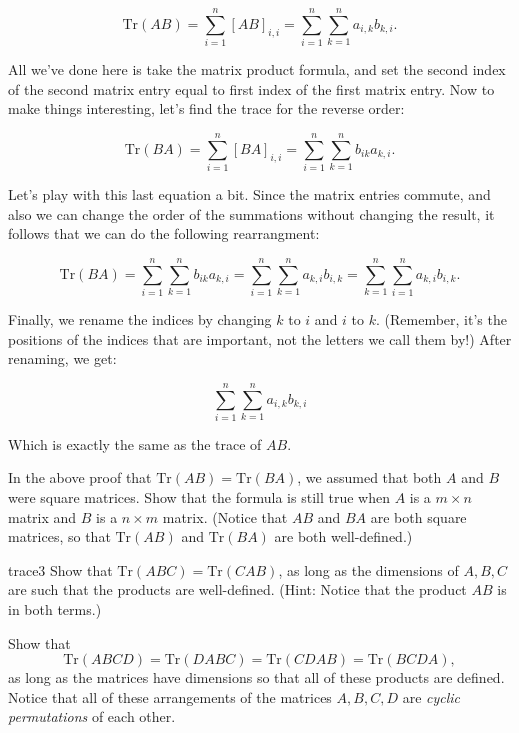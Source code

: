 \[ \text{Tr} \left({A} {B}\right) = \sum_{i=1}^n [AB]_{i,i} = \sum_{i=1}^n \sum_{k=1}^n a_{i,k}b_{k,i}. \]

All we've done here is take the matrix product formula, and set the second index of the second  matrix entry equal to first index of the first matrix entry.  Now to make things interesting, let's find the trace for the reverse order:

\[ \text{Tr} \left({B} {A}\right) = \sum_{i=1}^n [BA]_{i,i} = \sum_{i=1}^n \sum_{k=1}^n b_{ik}a_{k,i}. \]

Let's play with this last equation a bit. Since the matrix entries commute, and also  we can change the order of the summations without changing the result, it follows that we can do the following rearrangment:

\[ \text{Tr} \left({B} {A}\right) =\sum_{i=1}^n \sum_{k=1}^n b_{ik}a_{k,i} = \sum_{i=1}^n \sum_{k=1}^n a_{k,i}b_{i,k} = \sum_{k=1}^n \sum_{i=1}^n a_{k,i}b_{i,k}. \]

Finally, we rename the indices by changing $k$ to $i$ and $i$ to $k$.  (Remember, it's the positions of the indices that are important, not the letters we call them by!)  After renaming, we get:

\[ \sum_{i=1}^n \sum_{k=1}^n a_{i,k}b_{k,i} \]

Which is exactly the same as the trace of ${A}{B}$.

\begin {exercise}{}
In the above proof that $\text{Tr} ({AB}) = \text{Tr}({BA})$, we assumed that both $A$ and $B$ were square matrices. Show that the formula is still true when $A$ is a $m \times n$ matrix and $B$ is a $n \times m$ matrix.  (Notice that $AB$ and $BA$ are both square matrices, so that $\text{Tr} \left({A} {B}\right)$ and $\text{Tr} \left({B} {A}\right)$ are both well-defined.)
\end{exercise}

\begin {exercise}{trace3}
Show that $\text{Tr} ({ABC}) = \text{Tr}({CAB})$, as long as the dimensions of $A, B, C$ are such that the products are well-defined.
(Hint: Notice that the product ${AB}$ is in both terms.)
\end{exercise}


\begin {exercise}{}
Show that 
\[ \text{Tr} ({ABCD}) = \text{Tr}({DABC})= \text{Tr}({CDAB}) = \text{Tr}({BCDA}),\] 
as long as the matrices have dimensions so that all of these products are defined.  Notice that all of these arrangements of the matrices $A, B, C, D$ are \emph{cyclic permutations} of each other.
\end{exercise}

